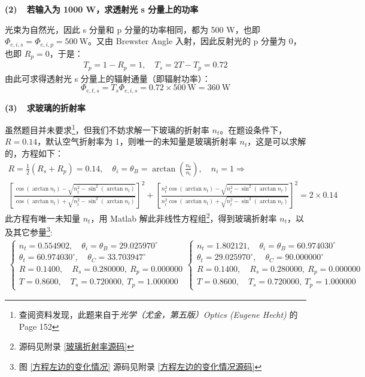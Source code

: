 \documentclass[UTF8]{report}
\theoremstyle{MyLineTheoremStyle} %
\theoremstyle{MyBlockTheoremStyle} %
\theoremstyle{MySubsubsectionStyle} %
\begin{document}
\textbf{(2)\ \ 若输入为 1000 W，求透射光 s 分量上的功率}

光束为自然光，因此 s 分量和 p 分量的功率相同，都为 500 W，也即 $\Phi_{e,i,s} = \Phi_{e,i,p} = 500 \ \mathrm{W}$。又由 Brewster Angle 入射，因此反射光的 p 分量为 0，也即 $R_p = 0$，于是：
\begin{gather}
T_p = 1 - R_p = 1,\quad T_s = 2T - T_p = 0.72 
\end{gather}
由此可求得透射光 s 分量上的辐射通量（即辐射功率）：
\begin{equation}
\Phi_{e,t,s} = T_s \Phi_{e,i,s} = 0.72 \times 500 \ \mathrm{W} =  360 \ \mathrm{W}
\end{equation}

{\color{red} \textbf{(3)\ \ 求玻璃的折射率}}

虽然题目并未要求\footnote{查阅资料发现，此题来自于\textit{光学（尤金，第五版）Optics (Eugene Hecht)} 的 Page 152}，但我们不妨求解一下玻璃的折射率 $n_t$。在题设条件下，$R = 0.14$，默认空气折射率为 1，则唯一的未知量是玻璃折射率 $n_t$，这是可以求解的，方程如下：
\begin{gather}\label{玻璃折射率}
    R = \frac{1}{2}(R_s + R_p) = 0.14,\quad \theta_i = \theta_B = \arctan\left(\frac{n_t}{n_i}\right) ,\quad n_i = 1
    \Longrightarrow \\ 
    \left[ \frac{ \cos (\arctan n_t) - \sqrt{n_{t}^2 - \sin^2 (\arctan n_t)} }{\cos (\arctan n_t) + \sqrt{n_{t}^2 - \sin^2 (\arctan n_t)}} \right]^2 + \left[ \frac{ n_{t}^2\cos (\arctan n_t) - \sqrt{n_{t}^2 - \sin^2 (\arctan n_t)} }{n_{t}^2\cos (\arctan n_t) + \sqrt{n_{t}^2 - \sin^2 (\arctan n_t)}} \right]^2  = 2\times 0.14
\end{gather}
此方程有唯一未知量 $n_t$，用 Matlab 解此非线性方程组\footnote{源码见附录 \ref{玻璃折射率源码}}，得到玻璃折射率 $n_t$，以及其它参量\footnote{图 \ref{方程左边的变化情况} 源码见附录 \ref{方程左边的变化情况源码}}: 
\begin{gather}
\begin{cases}
    n_t = 0.554902 
    ,\quad 
    \theta_i = \theta_B  = 29.025970^\circ
    \\
    \theta_t = 60.974030^\circ
    ,\quad 
    \theta_C = 33.703947^\circ
    \\
    R = 0.1400,\quad   R_s = 0.280000,\    R_p = 0.000000 \\ 
    T = 0.8600,\quad   T_s = 0.720000,\    T_p = 1.000000 
\end{cases}
\begin{cases}
    n_t = 1.802121
    ,\quad 
    \theta_i = \theta_B  = 60.974030^\circ 
    \\
    \theta_t = 29.025970^\circ
    ,\quad 
    \theta_C = 90.000000^\circ
    \\
    R = 0.1400,\quad   R_s = 0.280000,\    R_p = 0.000000 \\ 
    T = 0.8600,\quad   T_s = 0.720000,\    T_p = 1.000000 
\end{cases}
\end{gather}
\end{document}

